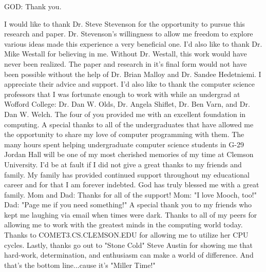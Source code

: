 
GOD:  Thank you. 

I would like to thank Dr$.$ Steve Stevenson for the opportunity to 
pursue this research and paper.  Dr$.$ Stevenson's willingness to allow me 
freedom to explore various ideas made this experience a very beneficial 
one.  I'd also like to thank Dr$.$ Mike Westall for believing in me.
Without Dr$.$ Westall, this work would have never been realized. 
The paper and research in it's final form would not have been possible 
without the help of Dr$.$ Brian Malloy and Dr$.$ Sandee Hedetniemi.  I 
appreciate their advice and support. I'd also like to thank the computer
science professors that I was fortunate enough to work with while an undergrad
at Wofford College:  Dr$.$ Dan W$.$ Olds, Dr$.$ Angela Shiflet, Dr$.$ Ben Varn, and 
Dr$.$ Dan W$.$ Welch.  The four of you provided me with an excellent foundation 
in computing.  A special thanks to all of the 
undergraduates that have allowed me the opportunity to share my love of 
computer programming with them.  The many hours spent helping undergraduate 
computer science students in G-29 Jordan Hall will be one of my most 
cherished memories of my time at Clemson University. 
I'd be at fault if I did not give a great thanks to my friends and family.
My family has provided continued support throughout my educational career 
and for that I am forever indebted.  God has truly blessed me with a great 
family. Mom and Dad:  Thanks for all of the support! 
Mom: "I love Mooch, too!"   Dad: "Page me if you need something!"
A special thank you to my friends who kept me laughing via email 
when times were dark.  Thanks to all of my peers for allowing me to work
with the greatest minds in the computing world today.  Thanks to 
COMET3.CS.CLEMSON.EDU for allowing me to utilize her CPU cycles. 
Lastly, thanks go out to "Stone Cold" Steve Austin 
for showing me that hard-work, determination, and enthusiasm can make a 
world of difference.  And that's the bottom line...cause it's "Miller Time!"

